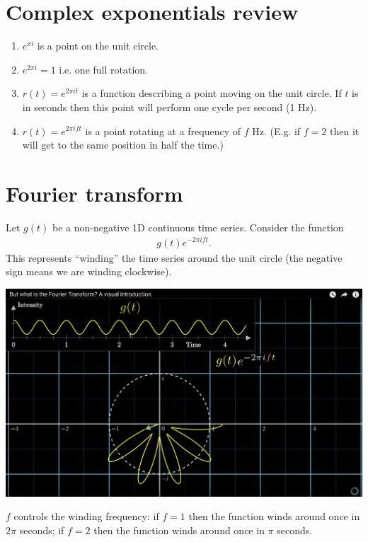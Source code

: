 \section{Complex exponentials review}
\begin{enumerate}
\item $e^{xi}$ is a point on the unit circle.
\item $e^{2\pi i} = 1$ i.e. one full rotation.
\item $r(t) = e^{2\pi i t}$ is a function describing a point moving on the unit circle. If $t$ is in seconds then
  this point will perform one cycle per second (1 Hz).
\item $r(t) = e^{2\pi i f t}$ is a point rotating at a frequency of $f$ Hz. (E.g. if $f = 2$ then it will get to
  the same position in half the time.)
\end{enumerate}

\section{Fourier transform}

Let $g(t)$ be a non-negative 1D continuous time series. Consider the function
\begin{align*}
  g(t)e^{-2\pi i f t}.
\end{align*}
This represents ``winding'' the time series around the unit circle (the negative sign means we are winding
clockwise).

\begin{mdframed}
\includegraphics[width=400pt]{img/fourier--complex-exponentials-review--fourier-transform-75f4.png}
\end{mdframed}

$f$ controls the winding frequency: if $f = 1$ then the function winds around once in $2\pi$ seconds;
if $f = 2$ then the function winds around once in $\pi$ seconds.

